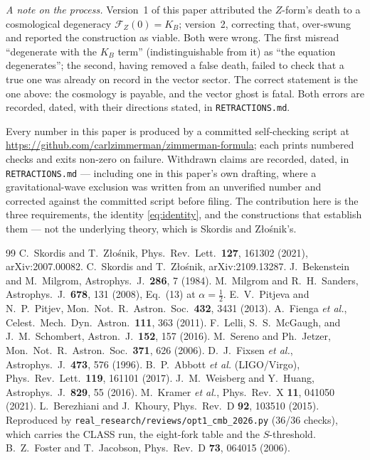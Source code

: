 \documentclass[aps,prd,twocolumn,10pt,nofootinbib,superscriptaddress]{revtex4-2}
\newcommand{\FF}{\mathcal{F}}
\begin{document}
\emph{A note on the process.} Version~1 of this paper attributed the $Z$-form's death to a
cosmological degeneracy $\FF_Z(0)=K_B$; version~2, correcting that, over-swung and reported the
construction as viable. Both were wrong. The first misread ``degenerate with the $K_B$ term''
(indistinguishable from it) as ``the equation degenerates''; the second, having removed a false
death, failed to check that a true one was already on record in the vector sector. The correct
statement is the one above: the cosmology is payable, and the vector ghost is fatal. Both errors
are recorded, dated, with their directions stated, in \texttt{RETRACTIONS.md}.

\begin{acknowledgments}
Every number in this paper is produced by a committed self-checking script at
\url{https://github.com/carlzimmerman/zimmerman-formula}; each prints numbered checks and exits
non-zero on failure. Withdrawn claims are recorded, dated, in \texttt{RETRACTIONS.md} --- including
one in this paper's own drafting, where a gravitational-wave exclusion was written from an
unverified number and corrected against the committed script before filing. The contribution here
is the three requirements, the identity \eqref{eq:identity}, and the constructions that establish
them --- not the underlying theory, which is Skordis and Z\l o\'snik's.
\end{acknowledgments}

\begin{thebibliography}{99}
 C.~Skordis and T.~Z\l o\'snik, Phys.\ Rev.\ Lett.\ \textbf{127}, 161302 (2021),
  arXiv:2007.00082.
 C.~Skordis and T.~Z\l o\'snik, arXiv:2109.13287.
 J.~Bekenstein and M.~Milgrom, Astrophys.\ J.\ \textbf{286}, 7 (1984).
 M.~Milgrom and R.~H.~Sanders, Astrophys.\ J.\ \textbf{678}, 131 (2008),
  Eq.~(13) at $\alpha=\tfrac12$.
 E.~V.~Pitjeva and N.~P.~Pitjev, Mon.\ Not.\ R.\ Astron.\ Soc.\ \textbf{432},
  3431 (2013).
 A.~Fienga \textit{et al.}, Celest.\ Mech.\ Dyn.\ Astron.\ \textbf{111}, 363 (2011).
 F.~Lelli, S.~S.~McGaugh, and J.~M.~Schombert, Astron.\ J.\ \textbf{152}, 157 (2016).
 M.~Sereno and Ph.~Jetzer, Mon.\ Not.\ R.\ Astron.\ Soc.\ \textbf{371}, 626
  (2006).
 D.~J.~Fixsen \textit{et al.}, Astrophys.\ J.\ \textbf{473}, 576 (1996).
 B.~P.~Abbott \textit{et al.} (LIGO/Virgo), Phys.\ Rev.\ Lett.\ \textbf{119},
  161101 (2017).
 J.~M.~Weisberg and Y.~Huang, Astrophys.\ J.\ \textbf{829}, 55 (2016).
 M.~Kramer \textit{et al.}, Phys.\ Rev.\ X \textbf{11}, 041050 (2021).
 L.~Berezhiani and J.~Khoury, Phys.\ Rev.\ D \textbf{92}, 103510 (2015).
 Reproduced by \texttt{real\_research/reviews/opt1\_cmb\_2026.py}
  (36/36 checks), which carries the CLASS run, the eight-fork table and the $S$-threshold.
 B.~Z.~Foster and T.~Jacobson, Phys.\ Rev.\ D \textbf{73}, 064015 (2006).
\end{thebibliography}
\end{document}
